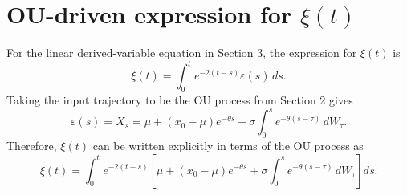 \documentclass[11pt]{article}
\begin{document}
\section{OU-driven expression for \texorpdfstring{$\xi(t)$}{xi(t)}}
\label{a:sec:alternative_ou_solution}
For the linear derived-variable equation in Section 3, the expression for
$\xi(t)$ is
\begin{equation}
    \xi(t)=\int_0^t e^{-2(t-s)}\varepsilon(s)\,ds.
\end{equation}
Taking the input trajectory to be the OU process from Section 2 gives
\begin{equation}
    \varepsilon(s)=X_s
    =\mu+(x_0-\mu)e^{-\theta s}
    +\sigma\int_0^s e^{-\theta(s-\tau)}\,dW_\tau.
\end{equation}
Therefore, $\xi(t)$ can be written explicitly in terms of the OU process as
\begin{equation}
    \xi(t)=\int_0^t e^{-2(t-s)}
    \left[
    \mu+(x_0-\mu)e^{-\theta s}
    +\sigma\int_0^s e^{-\theta(s-\tau)}\,dW_\tau
    \right]ds.
\end{equation}
\end{document}
